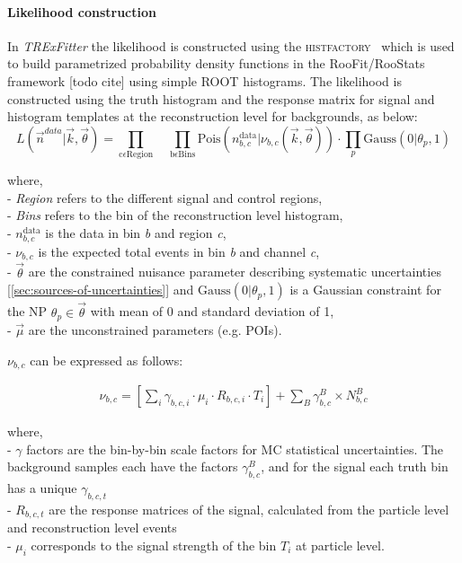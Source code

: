 \paragraph{Likelihood construction}
In \emph{TRExFitter} the likelihood is constructed using the \textsc{histfactory}~\cite{Cranmer:2012sba} which is used to build parametrized probability density functions in the RooFit/RooStats framework [todo cite] using simple ROOT histograms. The likelihood is constructed using the truth histogram and the response matrix for signal and histogram templates at the reconstruction level for backgrounds, as below:
\begin{equation}\label{eq:likelihodd-defn}
	L(\vec{n}^{data} | \vec{k}, \vec{\theta}) = \prod_{\mathrm{c} \epsilon \mathrm{Region}} \quad \prod_{\mathrm{b} \epsilon \mathrm{Bins}} \mathrm{Pois} (n^{\mathrm{data}}_{b,c}|\nu_{b,c}(\vec{k}, \Vec{\theta})) \cdot \prod_{p} \mathrm{Gauss}(0|\theta_{p},1)
\end{equation}

where,\\ 
- \textit{Region} refers to the different signal and control regions,\\
- \textit{Bins} refers to the bin of the reconstruction level histogram,\\
- $n^{\mathrm{data}}_{b,c}$ is the data in bin \textit{b} and region \textit{c}, \\
- $\nu_{b,c}$ is the expected total events in bin \textit{b} and channel \textit{c}, \\
- $\Vec{\theta}$ are the constrained nuisance parameter describing systematic uncertainties [\ref{sec:sources-of-uncertainties}] and $\mathrm{Gauss}(0|\theta_p,1)$ is a Gaussian constraint for the NP $\theta_p \in \vec{\theta}$ with mean of 0 and standard deviation of 1,\\
- $\vec{\mu}$ are the unconstrained parameters (e.g. POIs).

$\nu_{b,c}$ can be expressed as follows:

\begin{align}\label{eq:likelihodd-defn-1}
    \nu_{b,c} = \left[\sum_i \gamma_{b,c,i} \cdot \mu_{i} \cdot R_{b,c,i} \cdot T_{i}\right] + \sum_{B} \gamma_{b,c}^{B} \times N_{b,c}^{B} 
\end{align}

where, \\
- $\gamma$ factors are the bin-by-bin scale factors for MC statistical uncertainties. The background samples each have the factors $\gamma_{b,c}^{B}$, and for the signal each truth bin has a unique $\gamma_{b,c,t}$\\
- $R_{b,c,t}$ are the response matrices of the signal, calculated from the particle level and reconstruction level events \\
- $\mu_{i}$ corresponds to the signal strength of the bin $T_{i}$ at particle level.

